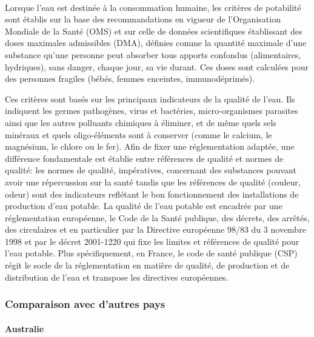 \documentclass{article}
\begin{document}
\paragraph{} Lorsque l’eau est destinée à la consommation humaine, les critères de potabilité sont établis sur la base des recommandations en vigueur de l’Organisation Mondiale de la Santé (OMS) et sur celle de données scientifiques établissant des doses maximales admissibles (DMA), définies comme la quantité maximale d’une substance qu’une personne peut absorber tous apports confondus (alimentaires, hydriques), sans danger, chaque jour, sa vie durant. Ces doses sont calculées pour des personnes fragiles (bébés, femmes enceintes, immunodéprimés).

Ces critères sont basés sur les principaux indicateurs de la qualité de l’eau. Ils indiquent les  germes pathogènes, virus et bactéries, micro-organismes parasites ainsi que les autres polluants chimiques à éliminer, et de même quels sels minéraux et quels oligo-éléments sont à conserver (comme le calcium, le magnésium, le chlore ou le fer). Afin de fixer une réglementation adaptée, une différence fondamentale est établie entre références de qualité et normes de qualité: les normes de qualité, impératives, concernant des substances pouvant avoir une répercussion sur la santé tandis que les références de qualité (couleur, odeur) sont des indicateurs reflétant le bon fonctionnement des installations de production d’eau potable.
La qualité de l’eau potable est encadrée par une réglementation européenne, le Code de la Santé publique, des décrets, des arrêtés, des circulaires et en particulier par la Directive européenne 98/83 du 3 novembre 1998 et par  le décret 2001-1220 qui fixe les limites et références de qualité pour l’eau potable. Plus spécifiquement, en France, le code de santé publique (CSP) régit le socle de la réglementation en matière de qualité, de production et de distribution de l’eau et transpose les directives européennes. 

\subsubsection{Comparaison avec d’autres pays}

\paragraph{Australie}
\end{document}
